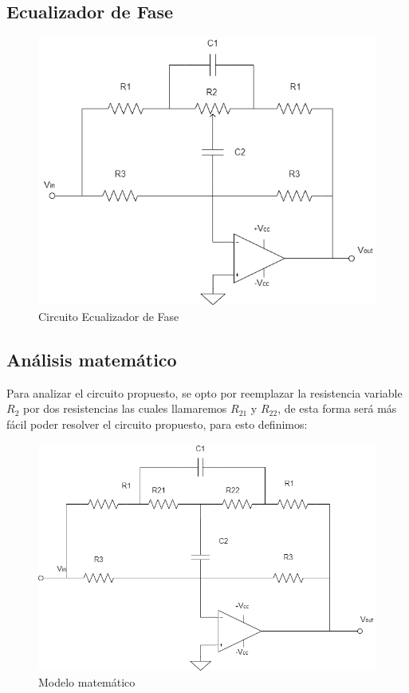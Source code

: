 \subsection{Ecualizador de Fase}


\begin{figure}[hbtp]
\caption{Circuito Ecualizador de Fase}
\centering
\includegraphics[scale=1]{Informe/Ecualizador de Fase.png}
\end{figure}


\subsection{Análisis matemático}

Para analizar el circuito propuesto, se opto por reemplazar la resistencia variable $R_2$ por dos resistencias las cuales llamaremos $R_{21}$ y $R_{22}$, de esta forma será más fácil poder resolver el circuito propuesto, para esto definimos:


\begin{figure}[H]
	\centering
	\includegraphics[scale=1]{Informe/EcSinPot.png}
	\caption{Modelo matemático}
\end{figure}
